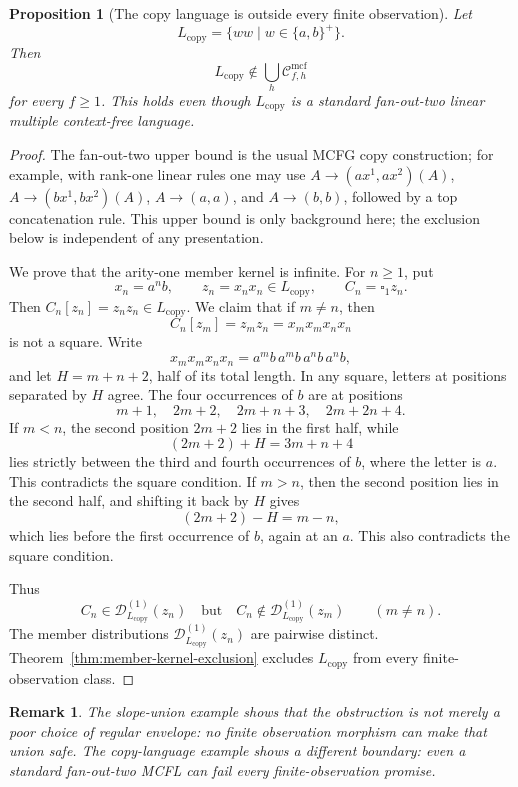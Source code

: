 \documentclass[11pt,a4paper]{article}
\newtheorem{proposition}[theorem]{Proposition}
\newtheorem{remark}[theorem]{Remark}
\theoremstyle{remark}
\newcommand{\Cmcf}[2]{\mathcal{C}^{\mathrm{mcf}}_{#1,#2}}
\newcommand{\D}{\mathcal{D}}
\newcommand{\blank}{\square}
\begin{document}
\begin{proposition}[The copy language is outside every finite observation]
\label{prop:copy-language-outside-every-finite-observation}
Let
\[
  L_{\mathrm{copy}}=
  \{ww\mid w\in\{a,b\}^+\}.
\]
Then
\[
  L_{\mathrm{copy}}\notin\bigcup_h \Cmcf{f}{h}
\]
for every \(f\ge1\).  This holds even though \(L_{\mathrm{copy}}\) is a standard
fan-out-two linear multiple context-free language.
\end{proposition}

\begin{proof}
The fan-out-two upper bound is the usual MCFG copy construction; for example,
with rank-one linear rules one may use
\(A\to(a x^1,a x^2)(A)\), \(A\to(b x^1,b x^2)(A)\),
\(A\to(a,a)\), and \(A\to(b,b)\), followed by a top concatenation rule.  This
upper bound is only background here; the exclusion below is independent of any
presentation.

We prove that the arity-one member kernel is infinite.  For \(n\ge1\), put
\[
  x_n=a^n b,
  \qquad
  z_n=x_nx_n\in L_{\mathrm{copy}},
  \qquad
  C_n=\blank_1 z_n .
\]
Then \(C_n[z_n]=z_nz_n\in L_{\mathrm{copy}}\).  We claim that if \(m\ne n\), then
\[
  C_n[z_m]=z_mz_n=x_mx_mx_nx_n
\]
is not a square.  Write
\[
  x_mx_mx_nx_n=a^m b\,a^m b\,a^n b\,a^n b,
\]
and let \(H=m+n+2\), half of its total length.  In any square, letters at
positions separated by \(H\) agree.  The four occurrences of \(b\) are at
positions
\[
  m+1,
  \quad 2m+2,
  \quad 2m+n+3,
  \quad 2m+2n+4 .
\]
If \(m<n\), the second position \(2m+2\) lies in the first half, while
\[
  (2m+2)+H=3m+n+4
\]
lies strictly between the third and fourth occurrences of \(b\), where the
letter is \(a\).  This contradicts the square condition.  If \(m>n\), then the
second position lies in the second half, and shifting it back by \(H\) gives
\[
  (2m+2)-H=m-n,
\]
which lies before the first occurrence of \(b\), again at an \(a\).  This also
contradicts the square condition.

Thus
\[
  C_n\in\D_{L_{\mathrm{copy}}}^{(1)}(z_n)
  \quad\text{but}\quad
  C_n\notin\D_{L_{\mathrm{copy}}}^{(1)}(z_m)
  \qquad(m\ne n).
\]
The member distributions \(\D_{L_{\mathrm{copy}}}^{(1)}(z_n)\) are pairwise
distinct.  Theorem~\ref{thm:member-kernel-exclusion} excludes
\(L_{\mathrm{copy}}\) from every finite-observation class.
\end{proof}

\begin{remark}
The slope-union example shows that the obstruction is not merely a poor choice
of regular envelope: no finite observation morphism can make that union safe.
The copy-language example shows a different boundary: even a standard fan-out-two
MCFL can fail every finite-observation promise.
\end{remark}
\end{document}
